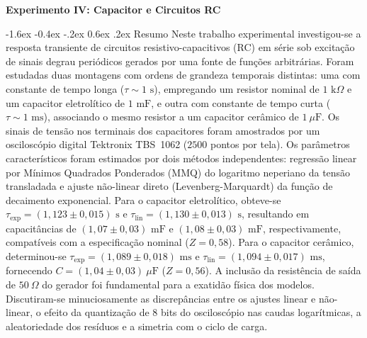 \documentclass[12pt, a4paper]{article}
\makeatletter
\renewcommand\section{\@startsection {section}{1}{\z@}%
                                   {-1.6ex \@plus -0.4ex \@minus -.2ex}%
                                   {0.6ex \@plus .2ex}%
                                   {\normalfont\large\bfseries}}
\makeatother
\begin{document}
\setcounter{page}{1}

\begin{center}
    {\large \textbf{Experimento IV: Capacitor e Circuitos RC}} \par
\end{center}

\vspace{-0.3cm}
\section{Resumo}
Neste trabalho experimental investigou-se a resposta transiente de circuitos resistivo-capacitivos (RC) em série sob excitação de sinais degrau periódicos gerados por uma fonte de funções arbitrárias. Foram estudadas duas montagens com ordens de grandeza temporais distintas: uma com constante de tempo longa ($\tau \sim 1\text{ s}$), empregando um resistor nominal de $1\text{ k}\Omega$ e um capacitor eletrolítico de $1\text{ mF}$, e outra com constante de tempo curta ($\tau \sim 1\text{ ms}$), associando o mesmo resistor a um capacitor cerâmico de $1\ \mu\text{F}$. Os sinais de tensão nos terminais dos capacitores foram amostrados por um osciloscópio digital Tektronix TBS~1062 ($2500$ pontos por tela). Os parâmetros característicos foram estimados por dois métodos independentes: regressão linear por Mínimos Quadrados Ponderados (MMQ) do logaritmo neperiano da tensão transladada e ajuste não-linear direto (Levenberg-Marquardt) da função de decaimento exponencial. Para o capacitor eletrolítico, obteve-se $\tau_{\text{exp}} = (1{,}123 \pm 0{,}015)\text{ s}$ e $\tau_{\text{lin}} = (1{,}130 \pm 0{,}013)\text{ s}$, resultando em capacitâncias de $(1{,}07 \pm 0{,}03)\text{ mF}$ e $(1{,}08 \pm 0{,}03)\text{ mF}$, respectivamente, compatíveis com a especificação nominal ($Z = 0{,}58$). Para o capacitor cerâmico, determinou-se $\tau_{\text{exp}} = (1{,}089 \pm 0{,}018)\text{ ms}$ e $\tau_{\text{lin}} = (1{,}094 \pm 0{,}017)\text{ ms}$, fornecendo $C = (1{,}04 \pm 0{,}03)\ \mu\text{F}$ ($Z = 0{,}56$). A inclusão da resistência de saída de $50\ \Omega$ do gerador foi fundamental para a exatidão física dos modelos. Discutiram-se minuciosamente as discrepâncias entre os ajustes linear e não-linear, o efeito da quantização de 8 bits do osciloscópio nas caudas logarítmicas, a aleatoriedade dos resíduos e a simetria com o ciclo de carga.

\vspace{-0.25cm}
\end{document}
